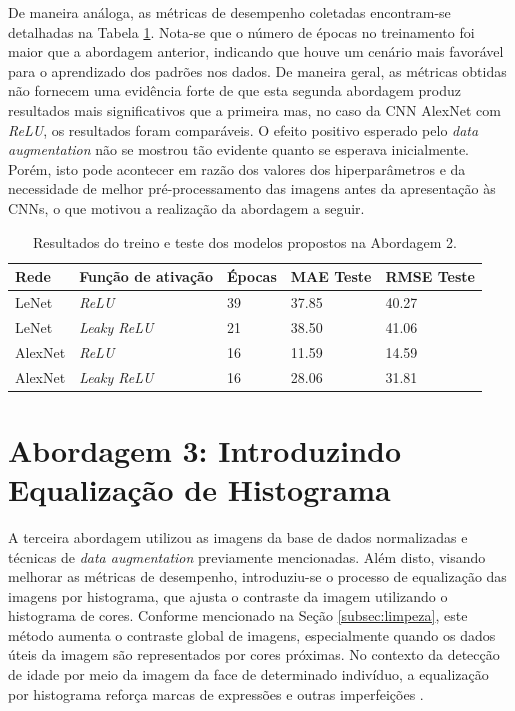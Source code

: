 	De maneira análoga, as métricas de desempenho coletadas encontram-se detalhadas na Tabela \ref{tab:results2}. Nota-se que o número de épocas no treinamento foi maior que a abordagem anterior, indicando que houve um cenário mais favorável para o aprendizado dos padrões nos dados. De maneira geral, as métricas obtidas não fornecem uma evidência forte de que esta segunda abordagem produz resultados mais significativos que a primeira mas, no caso da CNN AlexNet com \emph{ReLU}, os resultados foram comparáveis. O efeito positivo esperado pelo \emph{data augmentation} não se mostrou tão evidente quanto se esperava inicialmente. Porém, isto pode acontecer em razão dos valores dos hiperparâmetros e da necessidade de melhor pré-processamento das imagens antes da apresentação às CNNs, o que motivou a realização da abordagem a seguir.

	\begin{table}[!hb]
		\caption{Resultados do treino e teste dos modelos propostos na Abordagem 2.}
		\label{tab:results2}
		\begin{center}
			\begin{tabular}{l l l l l}
				\toprule
				Rede & Função de ativação & Épocas & MAE Teste & RMSE Teste \\
				\midrule
				LeNet & \emph{ReLU}  & 39 & 37.85 & 40.27 \\
				LeNet & \emph{Leaky ReLU} & 21 & 38.50 & 41.06 \\
				AlexNet & \emph{ReLU}  & 16 & 11.59 & 14.59 \\
				AlexNet & \emph{Leaky ReLU} & 16 & 28.06 & 31.81 \\
				\bottomrule
			\end{tabular}
		\end{center}
	\end{table}



\section{Abordagem 3: Introduzindo Equalização de Histograma}%
	A terceira abordagem utilizou as imagens da base de dados normalizadas e técnicas de \emph{data augmentation} previamente mencionadas. Além disto, visando melhorar as métricas de desempenho, introduziu-se o processo de equalização das imagens por histograma, que ajusta o contraste da imagem utilizando o histograma de cores. Conforme mencionado na Seção \ref{subsec:limpeza}, este método aumenta o contraste global de imagens, especialmente quando os dados úteis da imagem são representados por cores próximas. No contexto da detecção de idade por meio da imagem da face de determinado indivíduo, a equalização por histograma reforça marcas de expressões e outras imperfeições \cite{acharya2005image}. %

